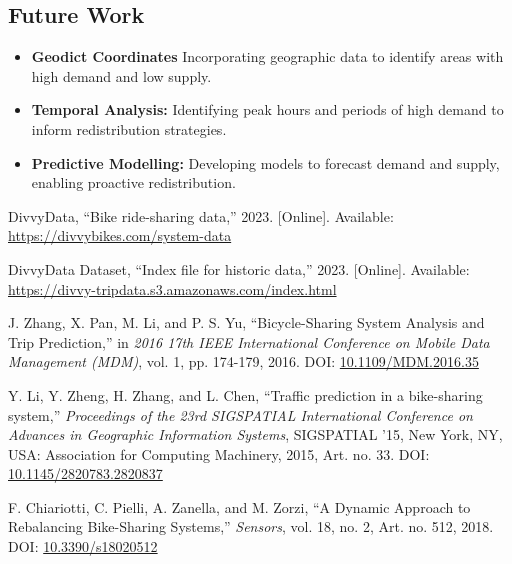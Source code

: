 \documentclass[12pt, a4paper]{article}
\begin{document}
    \subsection{Future Work}\label{subsec:future-work}
        \begin{itemize}
            \item \textbf{Geodict Coordinates} Incorporating geographic data to identify areas with high demand and low supply.
            \item \textbf{Temporal Analysis:} Identifying peak hours and periods of high demand to inform redistribution strategies.
            \item \textbf{Predictive Modelling:} Developing models to forecast demand and supply, enabling proactive redistribution.
        \end{itemize}
    \begin{thebibliography}{24}

        DivvyData, ``Bike ride-sharing data,'' 2023. [Online]. Available: \url{https://divvybikes.com/system-data}

        DivvyData Dataset, ``Index file for historic data,'' 2023. [Online]. Available: \url{https://divvy-tripdata.s3.amazonaws.com/index.html}

        J. Zhang, X. Pan, M. Li, and P. S. Yu, ``Bicycle-Sharing System Analysis and Trip Prediction,'' in \textit{2016 17th IEEE International Conference on Mobile Data Management (MDM)}, vol. 1, pp. 174-179, 2016. DOI: \href{https://doi.org/10.1109/MDM.2016.35}{10.1109/MDM.2016.35}

        Y. Li, Y. Zheng, H. Zhang, and L. Chen, ``Traffic prediction in a bike-sharing system,'' \textit{Proceedings of the 23rd SIGSPATIAL International Conference on Advances in Geographic Information Systems}, SIGSPATIAL '15, New York, NY, USA: Association for Computing Machinery, 2015, Art. no. 33. DOI: \href{https://doi.org/10.1145/2820783.2820837}{10.1145/2820783.2820837}

        F. Chiariotti, C. Pielli, A. Zanella, and M. Zorzi, ``A Dynamic Approach to Rebalancing Bike-Sharing Systems,'' \textit{Sensors}, vol. 18, no. 2, Art. no. 512, 2018. DOI: \href{https://www.mdpi.com/1424-8220/18/2/512}{10.3390/s18020512}

    \end{thebibliography}
\end{document}
